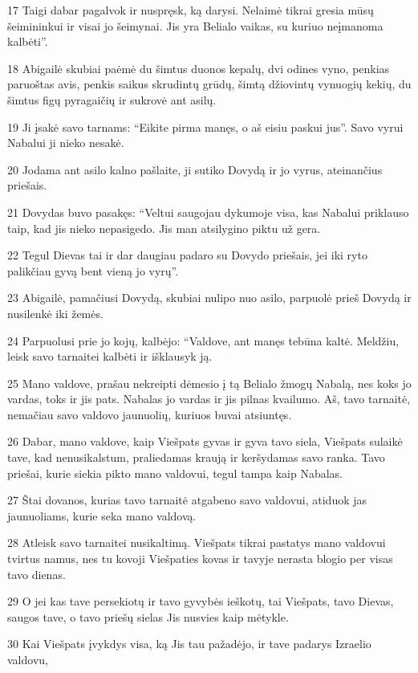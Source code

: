 \par 17 Taigi dabar pagalvok ir nuspręsk, ką darysi. Nelaimė tikrai gresia mūsų šeimininkui ir visai jo šeimynai. Jis yra Belialo vaikas, su kuriuo neįmanoma kalbėti”. 
\par 18 Abigailė skubiai paėmė du šimtus duonos kepalų, dvi odines vyno, penkias paruoštas avis, penkis saikus skrudintų grūdų, šimtą džiovintų vynuogių kekių, du šimtus figų pyragaičių ir sukrovė ant asilų. 
\par 19 Ji įsakė savo tarnams: “Eikite pirma manęs, o aš eisiu paskui jus”. Savo vyrui Nabalui ji nieko nesakė. 
\par 20 Jodama ant asilo kalno pašlaite, ji sutiko Dovydą ir jo vyrus, ateinančius priešais. 
\par 21 Dovydas buvo pasakęs: “Veltui saugojau dykumoje visa, kas Nabalui priklauso taip, kad jis nieko nepasigedo. Jis man atsilygino piktu už gera. 
\par 22 Tegul Dievas tai ir dar daugiau padaro su Dovydo priešais, jei iki ryto palikčiau gyvą bent vieną jo vyrų”. 
\par 23 Abigailė, pamačiusi Dovydą, skubiai nulipo nuo asilo, parpuolė prieš Dovydą ir nusilenkė iki žemės. 
\par 24 Parpuolusi prie jo kojų, kalbėjo: “Valdove, ant manęs tebūna kaltė. Meldžiu, leisk savo tarnaitei kalbėti ir išklausyk ją. 
\par 25 Mano valdove, prašau nekreipti dėmesio į tą Belialo žmogų Nabalą, nes koks jo vardas, toks ir jis pats. Nabalas jo vardas ir jis pilnas kvailumo. Aš, tavo tarnaitė, nemačiau savo valdovo jaunuolių, kuriuos buvai atsiuntęs. 
\par 26 Dabar, mano valdove, kaip Viešpats gyvas ir gyva tavo siela, Viešpats sulaikė tave, kad nenusikalstum, praliedamas kraują ir keršydamas savo ranka. Tavo priešai, kurie siekia pikto mano valdovui, tegul tampa kaip Nabalas. 
\par 27 Štai dovanos, kurias tavo tarnaitė atgabeno savo valdovui, atiduok jas jaunuoliams, kurie seka mano valdovą. 
\par 28 Atleisk savo tarnaitei nusikaltimą. Viešpats tikrai pastatys mano valdovui tvirtus namus, nes tu kovoji Viešpaties kovas ir tavyje nerasta blogio per visas tavo dienas. 
\par 29 O jei kas tave persekiotų ir tavo gyvybės ieškotų, tai Viešpats, tavo Dievas, saugos tave, o tavo priešų sielas Jis nusvies kaip mėtykle. 
\par 30 Kai Viešpats įvykdys visa, ką Jis tau pažadėjo, ir tave padarys Izraelio valdovu, 
